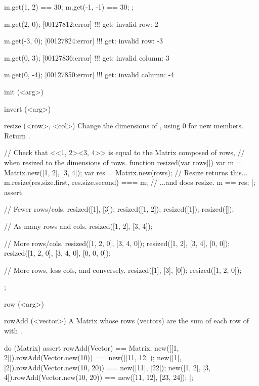 \begin{urbiscriptapi}
\begin{urbiscript}
{  m.get(1, 2) == 30;  m.get(-1, -1) == 30;
};

m.get(2, 0);
[00127812:error] !!! get: invalid row: 2

m.get(-3, 0);
[00127824:error] !!! get: invalid row: -3

m.get(0, 3);
[00127836:error] !!! get: invalid column: 3

m.get(0, -4);
[00127850:error] !!! get: invalid column: -4
\end{urbiscript}

\item[init](<arg>)%
\begin{urbiassert}

\end{urbiassert}

\item[invert](<arg>)%
\begin{urbiassert}

\end{urbiassert}

\item[resize](<row>, <col>)%
  Change the dimensions of \this, using 0 for new members.  Return \this.
\begin{urbiscript}
// Check that <<1, 2><3, 4>> is equal to the Matrix composed of rows,
// when resized to the dimensions of rows.
function resized(var rows[])
{
  var m = Matrix.new([1, 2], [3, 4]);
  var res = Matrix.new(rows);
  // Resize returns this...
  m.resize(res.size.first, res.size.second) === m;
  // ...and does resize.
  m == res;
}|;
assert
{
  // Fewer rows/cols.
  resized([1], [3]);
  resized([1, 2]);
  resized([1]);
  resized([]);

  // As many rows and cols.
  resized([1, 2], [3, 4]);

  // More rows/cols.
  resized([1, 2, 0], [3, 4, 0]);
  resized([1, 2], [3, 4], [0, 0]);
  resized([1, 2, 0], [3, 4, 0], [0, 0, 0]);

  // More rows, less cols, and conversely.
  resized([1], [3], [0]);
  resized([1, 2, 0]);
};
\end{urbiscript}

\item[row](<arg>)%
\begin{urbiassert}

\end{urbiassert}

\item[rowAdd](<vector>)%
  A Matrix whose rows (vectors) are the sum of each row of \this with
  .
\begin{urbiscript}
do (Matrix)
{
  assert
  {
    rowAdd(Vector) == Matrix;
    new([[1, 2]]).rowAdd(Vector.new(10))     == new([[11, 12]]);
    new([1], [2]).rowAdd(Vector.new(10, 20)) == new([11], [22]);
    new([1, 2], [3, 4]).rowAdd(Vector.new(10, 20)) == new([11, 12], [23, 24]);
  }
}|;
\end{urbiscript}


\end{urbiscriptapi}
